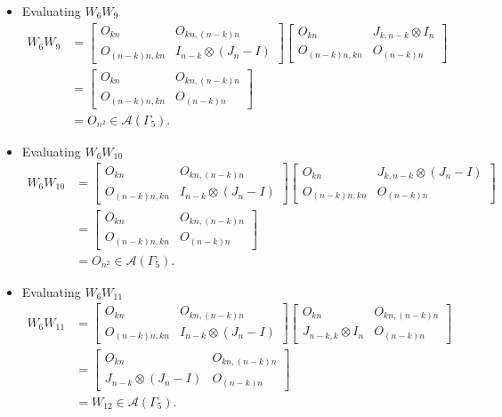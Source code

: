 \begin{itemize}
\item Evaluating $W_{6}W_{9}$
\begin{align*}
    W_6W_9
    &= \begin{bmatrix}
        O_{kn} & O_{kn, (n-k)n} \\
        O_{(n-k)n,kn} & I_{n - k} \otimes (J_n - I)
    \end{bmatrix}
    \begin{bmatrix}
        O_{kn} & J_{k,n-k} \otimes I_n \\
        O_{(n-k)n,kn} & O_{(n-k)n}
    \end{bmatrix}\\
    &= \begin{bmatrix}
        O_{kn} & O_{kn, (n-k)n} \\
        O_{(n-k)n,kn} & O_{(n - k)n}
    \end{bmatrix}\\
    &= O_{n^2} \in\mathcal{A}(\Gamma_5).
\end{align*}

\item Evaluating $W_{6}W_{10}$
\begin{align*}
    W_6W_{10}
    &= \begin{bmatrix}
        O_{kn} & O_{kn, (n-k)n} \\
        O_{(n-k)n,kn} & I_{n - k} \otimes (J_n - I)
    \end{bmatrix}
    \begin{bmatrix}
        O_{kn} & J_{k,n-k} \otimes (J_n-I) \\
        O_{(n-k)n,kn} & O_{(n-k)n}
    \end{bmatrix}\\
    &= \begin{bmatrix}
        O_{kn} & O_{kn, (n-k)n} \\
        O_{(n-k)n,kn} & O_{(n - k)n}
    \end{bmatrix}\\
    &= O_{n^2} \in\mathcal{A}(\Gamma_5).
\end{align*}

\item Evaluating $W_{6}W_{11}$
\begin{align*}
    W_6W_{11}
    &= \begin{bmatrix}
        O_{kn} & O_{kn, (n-k)n} \\
        O_{(n-k)n,kn} & I_{n - k} \otimes (J_n - I)
    \end{bmatrix}
    \begin{bmatrix}
        O_{kn} & O_{kn, (n-k)n} \\
        J_{n-k,k}\otimes I_n & O_{(n-k)n}
    \end{bmatrix}\\
    &= \begin{bmatrix}
        O_{kn} & O_{kn, (n-k)n} \\
        J_{n - k} \otimes (J_n - I) & O_{(n - k)n}
    \end{bmatrix}\\
    &= W_{12} \in\mathcal{A}(\Gamma_5).
\end{align*}


\end{itemize}
